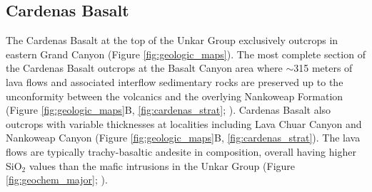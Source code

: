 \subsection{Cardenas Basalt}

The Cardenas Basalt at the top of the Unkar Group exclusively outcrops in eastern Grand Canyon (Figure \ref{fig:geologic_maps}). The most complete section of the Cardenas Basalt outcrops at the Basalt Canyon area where $\sim$315 meters of lava flows and associated interflow sedimentary rocks are preserved up to the unconformity between the volcanics and the overlying Nankoweap Formation (Figure \ref{fig:geologic_maps}B, \ref{fig:cardenas_strat}; \citealp{Lucchitta1983a, Hendricks1989a}). Cardenas Basalt also outcrops with variable thicknesses at localities including Lava Chuar Canyon and Nankoweap Canyon (Figure \ref{fig:geologic_maps}B, \ref{fig:cardenas_strat}). The lava flows are typically trachy-basaltic andesite in composition, overall having higher SiO$_2$ values than the mafic intrusions in the Unkar Group (Figure \ref{fig:geochem_major}; \citealp{Hendricks1989a, Larson1994a}).

